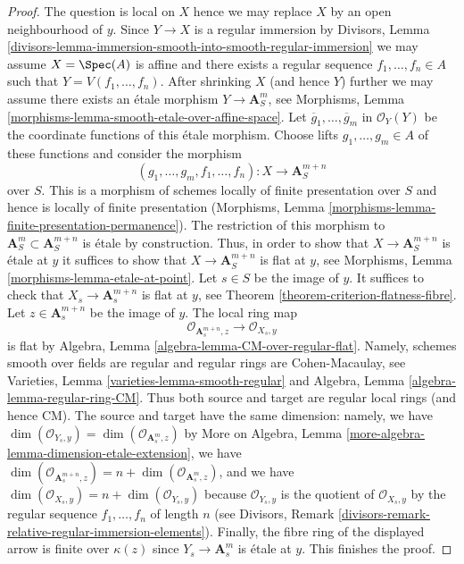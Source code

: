\begin{proof}
The question is local on $X$ hence we may replace $X$ by
an open neighbourhood of $y$. Since $Y \to X$ is a regular immersion
by Divisors, Lemma
\ref{divisors-lemma-immersion-smooth-into-smooth-regular-immersion}
we may assume $X = \Spec(A)$ is affine and there exists a regular sequence
$f_1, \ldots, f_n \in A$ such that $Y = V(f_1, \ldots, f_n)$.
After shrinking $X$ (and hence $Y$) further
we may assume there exists an \'etale morphism $Y \to \mathbf{A}^m_S$, see
Morphisms, Lemma \ref{morphisms-lemma-smooth-etale-over-affine-space}.
Let $\overline{g}_1, \ldots, \overline{g}_m$ in $\mathcal{O}_Y(Y)$
be the coordinate functions of this \'etale morphism.
Choose lifts $g_1, \ldots, g_m \in A$ of these functions
and consider the morphism
$$
(g_1, \ldots, g_m, f_1, \ldots, f_n) :
X
\longrightarrow
\mathbf{A}^{m + n}_S
$$
over $S$. This is a morphism of schemes locally of finite presentation
over $S$ and hence is locally of finite presentation
(Morphisms, Lemma \ref{morphisms-lemma-finite-presentation-permanence}).
The restriction of this morphism to
$\mathbf{A}^m_S \subset \mathbf{A}^{m + n}_S$
is \'etale by construction. Thus, in order to show that
$X \to \mathbf{A}^{m + n}_S$ is \'etale at $y$
it suffices to show that $X \to \mathbf{A}^{m + n}_S$ is flat at $y$,
see Morphisms, Lemma \ref{morphisms-lemma-etale-at-point}.
Let $s \in S$ be the image of $y$. It suffices to check that
$X_s \to \mathbf{A}^{m + n}_s$ is flat at $y$, see
Theorem \ref{theorem-criterion-flatness-fibre}.
Let $z \in \mathbf{A}^{m + n}_s$ be the image of $y$.
The local ring map
$$
\mathcal{O}_{\mathbf{A}^{m + n}_s, z}
\longrightarrow
\mathcal{O}_{X_s, y}
$$
is flat by Algebra, Lemma \ref{algebra-lemma-CM-over-regular-flat}.
Namely, schemes smooth over fields are regular and regular rings
are Cohen-Macaulay, see Varieties, Lemma \ref{varieties-lemma-smooth-regular}
and Algebra, Lemma \ref{algebra-lemma-regular-ring-CM}.
Thus both source and target are regular local rings (and hence CM).
The source and target have the same dimension: namely, we have
$\dim(\mathcal{O}_{Y_s, y}) = \dim(\mathcal{O}_{\mathbf{A}^m_s, z})$
by More on Algebra, Lemma \ref{more-algebra-lemma-dimension-etale-extension},
we have $\dim(\mathcal{O}_{\mathbf{A}^{m + n}_s, z}) = n +
\dim(\mathcal{O}_{\mathbf{A}^m_s, z})$, and we have
$\dim(\mathcal{O}_{X_s, y}) = n + \dim(\mathcal{O}_{Y_s, y})$
because $\mathcal{O}_{Y_s, y}$ is the quotient of
$\mathcal{O}_{X_s, y}$ by the regular sequence $f_1, \ldots, f_n$
of length $n$ (see
Divisors, Remark \ref{divisors-remark-relative-regular-immersion-elements}).
Finally, the fibre ring of the displayed arrow is finite over $\kappa(z)$
since $Y_s \to \mathbf{A}^m_s$ is \'etale at $y$.
This finishes the proof.
\end{proof}











